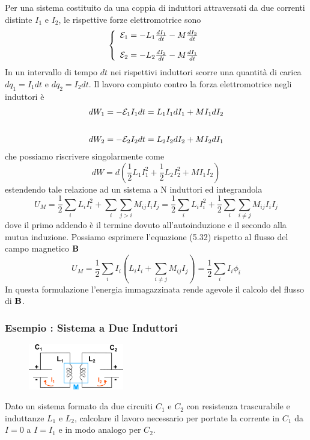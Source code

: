 Per una sistema costituito da una coppia di induttori attraversati da due correnti distinte $I_1$ e $I_2$, le rispettive forze elettromotrice sono 
\begin{align*}
	\left \{ \begin{array}{l}
 	\mathcal{E}_1 = - L_1 \frac{d I_1}{dt} - M \frac{dI_2}{dt} \\ \rule{0pt}{20pt}
 	\mathcal{E}_2 = - L_2 \frac{d I_2}{dt} - M \frac{d I_1}{dt}
 \end{array}\right.
\end{align*}
In un intervallo di tempo $dt$ nei rispettivi induttori scorre una quantit\`a di carica $dq_1 = I_1dt$ e $dq_2 = I_2 dt$. Il lavoro compiuto contro la forza elettromotrice negli induttori \`e 
\begin{align*}
	& dW_1 = - \mathcal{E}_1 I_1 dt = L_1 I_1 dI_1 + MI_1dI_2 \\ \rule{0pt}{25pt}
	& dW_2 = - \mathcal{E}_2 I_2 dt = L_2 I_2 d I_2 + MI_2 dI_1 
\end{align*}
che possiamo riscrivere singolarmente come 
\begin{equation*}
	dW = d \left( \frac{1}{2} L_1 I_1^2 + \frac{1}{2} L_2 I_2^2 + MI_1I_2\right)
\end{equation*}
estendendo tale relazione ad un sistema a N induttori ed integrandola 
\begin{equation}
	U_M =\frac{1}{2}\sum_{i} L_i I_i^2 + \sum_{i}\sum_{j > i}M_{ij}I_iI_j = \frac{1}{2}\sum_{i} L_i I_i^2 + \frac{1}{2} \sum_{i} \sum_{i \neq j} M_{ij}I_iI_j
\end{equation}
dove il primo addendo \`e il termine dovuto all'autoinduzione e il secondo alla mutua induzione. Possiamo esprimere l'equazione (5.32) rispetto al flusso del campo magnetico $\bold{B}$
\begin{equation}
	U_M =\frac{1}{2}\sum_i I_i \left(L_i I_i + \sum_{i \neq j}  M_{ij}I_j\right) = \frac{1}{2} \sum_{i}I_i \phi_i
\end{equation}
In questa formulazione l'energia immagazzinata rende agevole il calcolo del flusso di $\bold{B}$.

\subsubsection{Esempio : Sistema a Due Induttori}

\begin{figure} %
    \centering
    \includegraphics[width=0.37\textwidth]{images/mutual_inductance1} %
\end{figure}
Dato un sistema formato da due circuiti $C_1$ e $C_2$ con resistenza trascurabile e induttanze $L_1$ e $L_2$, calcolare il lavoro necessario per portate  la corrente in $C_1$ da $I= 0$ a $I = I_1$ e in modo analogo per $C_2$.

